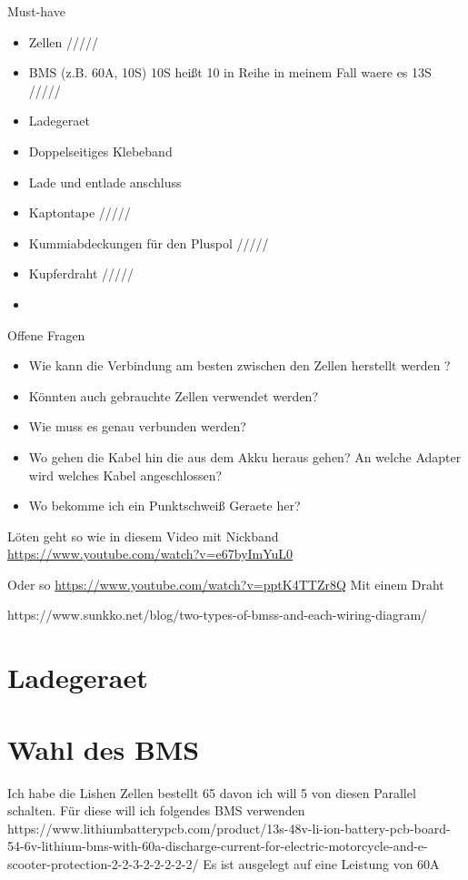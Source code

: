 Must-have
\begin{itemize}
    \item Zellen /////
    \item BMS (z.B. 60A, 10S) 10S heißt 10 in Reihe in meinem Fall waere es 13S /////
    \item Ladegeraet
    \item Doppelseitiges Klebeband
    \item Lade und entlade anschluss
    \item Kaptontape /////
    \item Kummiabdeckungen für den Pluspol /////
    \item Kupferdraht /////
    \item 
\end{itemize}

Offene Fragen
\begin{itemize}
    \item Wie kann die Verbindung am besten zwischen den Zellen herstellt werden ?
    \item Könnten auch gebrauchte Zellen verwendet werden?
    \item Wie muss es genau verbunden werden?
    \item Wo gehen die Kabel hin die aus dem Akku heraus gehen? An welche Adapter wird welches Kabel angeschlossen?
    \item Wo bekomme ich ein Punktschweiß Geraete her?
\end{itemize}


Löten geht so wie in diesem Video mit Nickband
\url{https://www.youtube.com/watch?v=e67byImYuL0}

Oder so \url{https://www.youtube.com/watch?v=pptK4TTZr8Q}
Mit einem Draht

https://www.sunkko.net/blog/two-types-of-bmss-and-each-wiring-diagram/


\section{Ladegeraet}

\section{Wahl des BMS}

Ich habe die Lishen Zellen bestellt 65 davon ich will 5 von diesen Parallel schalten.
Für diese will ich folgendes BMS verwenden 
https://www.lithiumbatterypcb.com/product/13s-48v-li-ion-battery-pcb-board-54-6v-lithium-bms-with-60a-discharge-current-for-electric-motorcycle-and-e-scooter-protection-2-2-3-2-2-2-2-2/
Es ist ausgelegt auf eine Leistung von 60A 

